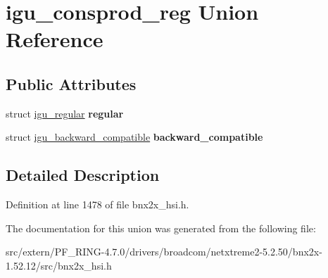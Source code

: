 \hypertarget{unionigu__consprod__reg}{
\section{igu\_\-consprod\_\-reg Union Reference}
\label{unionigu__consprod__reg}
}
\subsection*{Public Attributes}
\begin{DoxyCompactItemize}
\item 
\hypertarget{unionigu__consprod__reg_a5d3f0a90ee1b2d032e179e9975907154}{
struct \hyperlink{structigu__regular}{igu\_\-regular} {\bfseries regular}}
\label{unionigu__consprod__reg_a5d3f0a90ee1b2d032e179e9975907154}

\item 
\hypertarget{unionigu__consprod__reg_a6f6f892cbb1dd4cfbda0699b349b1d49}{
struct \hyperlink{structigu__backward__compatible}{igu\_\-backward\_\-compatible} {\bfseries backward\_\-compatible}}
\label{unionigu__consprod__reg_a6f6f892cbb1dd4cfbda0699b349b1d49}

\end{DoxyCompactItemize}


\subsection{Detailed Description}


Definition at line 1478 of file bnx2x\_\-hsi.h.



The documentation for this union was generated from the following file:\begin{DoxyCompactItemize}
\item 
src/extern/PF\_\-RING-\/4.7.0/drivers/broadcom/netxtreme2-\/5.2.50/bnx2x-\/1.52.12/src/bnx2x\_\-hsi.h\end{DoxyCompactItemize}
